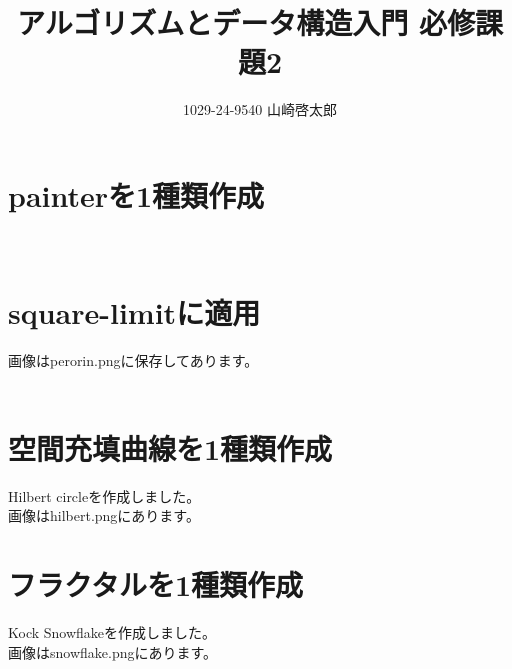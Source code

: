 ﻿\documentclass[a4paper,12pt]{article}
\title{アルゴリズムとデータ構造入門 必修課題2}
\author{1029-24-9540 山崎啓太郎}
\begin{document}
\maketitle

\section{painterを1種類作成}
\lstset{numbers=left,basicstyle=\small}

\\
\section{square-limitに適用}
\lstset{numbers=left,basicstyle=\small}

画像はperorin.pngに保存してあります。\\
\\
\section{空間充填曲線を1種類作成}
\lstset{numbers=left,basicstyle=\small}

Hilbert circleを作成しました。\\
画像はhilbert.pngにあります。\\
\section{フラクタルを1種類作成}
\lstset{numbers=left,basicstyle=\small}

Kock Snowflakeを作成しました。\\
画像はsnowflake.pngにあります。\\
\end{document}
